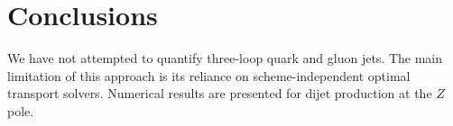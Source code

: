 \section{Conclusions}\label{sec:conclusions}

We have not attempted to quantify three-loop quark and gluon jets. The
main limitation of this approach is its reliance on scheme-independent
optimal transport solvers. Numerical results are presented for dijet
production at the $Z$ pole.


